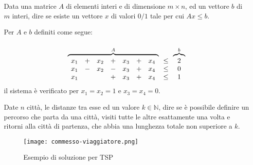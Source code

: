 \begin{problem}
    Data una matrice $A$ di elementi interi e di dimensione $m\times n$, ed un
    vettore $b$ di $m$ interi, dire se esiste un vettore $x$ di valori $0/1$
    tale per cui $Ax\leq b$.
\end{problem}
\begin{eg}
    Per $A$ e $b$ definiti come segue:
    \[\overbrace{\begin{array}[t]{ccccccc}
        x_1 & + & x_2 & + & x_3 & + & x_4\\
        x_1 & - & x_2 & - & x_3 & + & x_4\\
        x_1 &   &    & + & x_3 & + & x_4\\
    \end{array}}^{A}\begin{array}[]{c}
        \\
        \\
        \leq\\
        \leq\\
        \leq\\
    \end{array}\overbrace{\begin{array}[t]{c}
        2\\
        0\\
        1\\
    \end{array}}^{b}\]
    il sistema è verificato per $x_1=x_2=1$ e $x_3=x_4=0$.
\end{eg}

\begin{problem}
    Date $n$ città, le distanze tra esse ed un valore $k\in\mathbb{N}$, dire se
    è possibile definire un percorso che parta da una città, visiti tutte le
    altre esattamente una volta e ritorni alla città di partenza, che abbia
    una lunghezza totale non superiore a $k$.
\end{problem}
\begin{figure}[h!]
    \centering
    \texttt{[image: commesso-viaggiatore.png]}
    \caption{Esempio di soluzione per TSP}
\end{figure}

